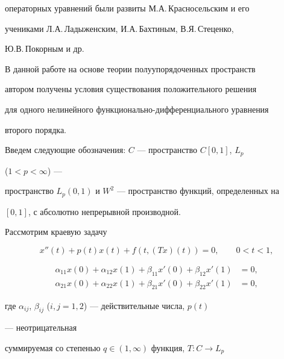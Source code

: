 операторных уравнений были развиты М.А.\,Красносельским и его 


учениками Л.А.\,Ладыженским, И.А.\,Бахтиным, В.Я.\,Сте\-цен\-ко, 


Ю.В.\,Покорным и др. 


 


В данной работе на основе теории полуупорядоченных пространств 


автором получены условия существования положительного решения 


для одного нелинейного функционально-дифференциального уравнения 


второго порядка. 


 


Введем следующие обозначения: $C$ --- пространство $C[0,1]$, $L_p$ 


($1<p<\infty$) --- 


пространство $L_p(0,1)$ и $W^2$ --- пространство функций, определенных на 


$[0,1]$, с абсолютно непрерывной производной. 


 


Рассмотрим краевую задачу 


\begin{equation} 


x''(t)+p(t)x(t)+f(t,(Tx)(t))=0,\qquad 0<t<1, 


\end{equation}


\begin{equation} 


\begin{split} 


\alpha_{11}x(0)+\alpha_{12}x(1)+\beta_{11} 


x'(0)+\beta_{12}x'(1)&=0,\\ 


\alpha_{21}x(0)+\alpha_{22}x(1)+\beta_{21}x'(0)+ 


\beta_{22}x'(1)&=0,


\end{split} 


\end{equation} 


где $\alpha_{ij}$, $\beta_{ij}$ ($i,j=1,2$) --- действительные числа, $p(t)$ 


--- неотрицательная 


суммируемая со степенью $q\in(1,\infty)$ функция, $T:C\to L_p$ 



